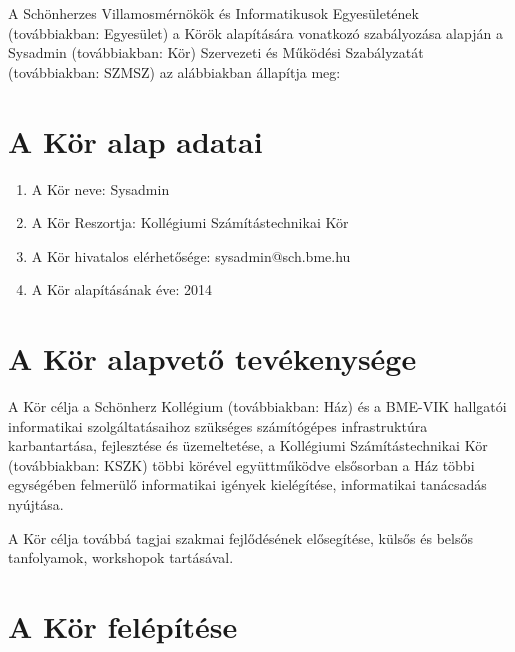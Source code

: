 \documentclass[12pt]{article}
\begin{document}
\FirstPage
\pagebreak

A Schönherzes Villamosmérnökök és Informatikusok Egyesületének (továbbiakban: Egyesület) a
Körök alapítására vonatkozó szabályozása alapján a Sysadmin (továbbiakban: Kör) Szervezeti és
Működési Szabályzatát (továbbiakban: SZMSZ) az alábbiakban állapítja meg:

\section{A Kör alap adatai}

\begin{enumerate}
  \item A Kör neve: Sysadmin
  \item A Kör Reszortja: Kollégiumi Számítástechnikai Kör
  \item A Kör hivatalos elérhetősége: sysadmin@sch.bme.hu
  \item A Kör alapításának éve: 2014
\end{enumerate}


\section{A Kör alapvető tevékenysége}

A Kör célja a Schönherz Kollégium (továbbiakban: Ház) és a BME-VIK hallgatói informatikai
szolgáltatásaihoz szükséges számítógépes infrastruktúra karbantartása, fejlesztése és üzemeltetése,
a Kollégiumi Számítástechnikai Kör (továbbiakban: KSZK) többi körével együttműködve elsősorban a
Ház többi egységében felmerülő informatikai igények kielégítése, informatikai tanácsadás nyújtása.

A Kör célja továbbá tagjai szakmai fejlődésének elősegítése, külsős és belsős tanfolyamok,
workshopok tartásával.


\section{A Kör felépítése}
\end{document}
